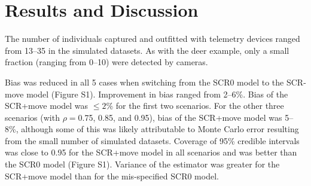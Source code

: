 \documentclass[12pt]{article}
\begin{document}
  


\section*{Results and Discussion}

The number of individuals captured and outfitted with telemetry
devices ranged from 13--35 in the simulated datasets. As with the deer
example, only a small fraction (ranging from 0--10) were detected by
cameras. 

Bias was reduced in all 5 cases when switching from the SCR0 model to
the SCR-move model (Figure S1). Improvement in bias ranged
from 2--6\%. Bias of the SCR+move model was $\le2\%$ for the first two
scenarios. For the other three scenarios (with 
$\rho=$0.75, 0.85, and 0.95), bias of the SCR+move model was
5--8\%, although some of this was likely attributable to Monte Carlo
error resulting from the small number of simulated datasets.
Coverage of 95\% credible intervals was close to 0.95 for
the SCR+move model in all scenarios and was better than the SCR0 model
(Figure S1). Variance of the estimator was greater for the
SCR+move model than for the mis-specified SCR0 model.


\clearpage
\end{document}
